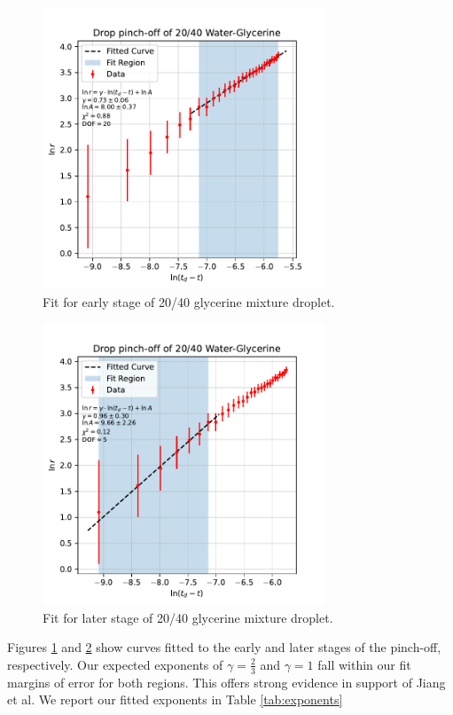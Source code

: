 \documentclass[12pt, letterpaper]{article}
\begin{document}
\begin{figure}[!h]
    \centering
    \includegraphics[width=0.75\textwidth]{experiment3/figures/plots/5glycefit1.pdf}
    \caption{Fit for early stage of 20/40 glycerine mixture droplet.}
    \label{fig:glycerine-fit1}
\end{figure}

\begin{figure}[!h]
    \centering
    \includegraphics[width=0.75\textwidth]{experiment3/figures/plots/5glycefit2.pdf}
    \caption{Fit for later stage of 20/40 glycerine mixture droplet.}
    \label{fig:glycerine-fit2}
\end{figure}

Figures \ref{fig:glycerine-fit1} and \ref{fig:glycerine-fit2} show curves fitted to the early and later stages of the pinch-off, respectively. Our expected exponents of $\gamma = \frac{2}{3}$ and $\gamma = 1$ fall within our fit margins of error for both regions. This offers strong evidence in support of Jiang et al. We report our fitted exponents in Table \ref{tab:exponents}
\end{document}
